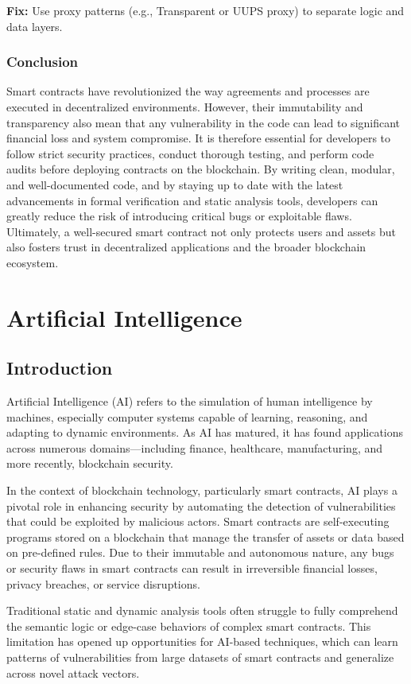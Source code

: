 \textbf{Fix:} Use proxy patterns (e.g., Transparent or UUPS proxy) to separate logic and data layers.

\subsection*{Conclusion}
Smart contracts have revolutionized the way agreements and processes are executed in decentralized environments. However, their immutability and transparency also mean that any vulnerability in the code can lead to significant financial loss and system compromise. It is therefore essential for developers to follow strict security practices, conduct thorough testing, and perform code audits before deploying contracts on the blockchain. By writing clean, modular, and well-documented code, and by staying up to date with the latest advancements in formal verification and static analysis tools, developers can greatly reduce the risk of introducing critical bugs or exploitable flaws. Ultimately, a well-secured smart contract not only protects users and assets but also fosters trust in decentralized applications and the broader blockchain ecosystem.

\chapter{Artificial Intelligence}
\section{Introduction}
Artificial Intelligence (AI) refers to the simulation of human intelligence by machines, especially computer systems capable of learning, reasoning, and adapting to dynamic environments. As AI has matured, it has found applications across numerous domains—including finance, healthcare, manufacturing, and more recently, blockchain security.

In the context of blockchain technology, particularly smart contracts, AI plays a pivotal role in enhancing security by automating the detection of vulnerabilities that could be exploited by malicious actors. Smart contracts are self-executing programs stored on a blockchain that manage the transfer of assets or data based on pre-defined rules. Due to their immutable and autonomous nature, any bugs or security flaws in smart contracts can result in irreversible financial losses, privacy breaches, or service disruptions.

Traditional static and dynamic analysis tools often struggle to fully comprehend the semantic logic or edge-case behaviors of complex smart contracts. This limitation has opened up opportunities for AI-based techniques, which can learn patterns of vulnerabilities from large datasets of smart contracts and generalize across novel attack vectors.

